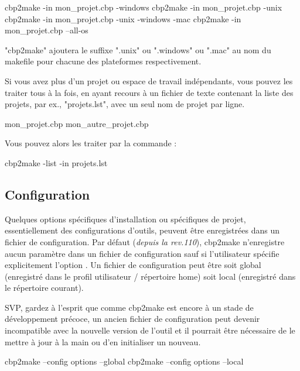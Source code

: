 \begin{code}
cbp2make -in mon_projet.cbp -windows
cbp2make -in mon_projet.cbp -unix
cbp2make -in mon_projet.cbp -unix -windows -mac
cbp2make -in mon_projet.cbp --all-os
\end{code}
"cbp2make" ajoutera le suffixe ".unix" ou ".windows" ou ".mac" au nom du makefile pour chacune des plateformes respectivement.

Si vous avez plus d'un projet ou espace de travail indépendants, vous pouvez les traiter tous à la fois, en ayant recours à un fichier de texte contenant la liste des projets, par ex., "projets.lst", avec un seul nom de projet par ligne.

\begin{code}
    mon_projet.cbp
    mon_autre_projet.cbp 
\end{code}

Vous pouvez alors les traiter par la commande :
\begin{code}
cbp2make -list -in projets.lst
\end{code}

\subsection{Configuration}

Quelques options spécifiques d'installation ou spécifiques de projet, essentiellement des configurations d'outils, peuvent être enregistrées dans un fichier de configuration. Par défaut (\textit{depuis la rev.110}), cbp2make n'enregistre aucun paramètre dans un fichier de configuration sauf si l'utilisateur spécifie explicitement l'option . Un fichier de configuration peut être soit global (enregistré dans le profil utilisateur / répertoire home) soit local (enregistré dans le répertoire courant).

SVP, gardez à l'esprit que comme cbp2make est encore à un stade de développement précoce, un ancien fichier de configuration peut devenir incompatible avec la nouvelle version de l'outil et il pourrait être nécessaire de le mettre à jour à la main ou d'en initialiser un nouveau.


\begin{code}
cbp2make --config options --global
cbp2make --config options --local
\end{code}


